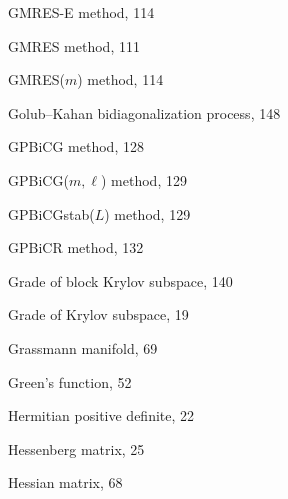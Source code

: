 \begin{description}
{GMRES-E method}, {114}\par

{GMRES method}, {111}\par

{GMRES($m$) method}, {114}\par

{Golub--Kahan bidiagonalization process}, {148}\par

{GPBiCG method}, {128}\par

{GPBiCG($m,\ell$) method}, {129}\par

{GPBiCGstab($L$) method}, {129}\par

{GPBiCR method}, {132}\par

{Grade of block Krylov subspace}, {140}\par

{Grade of Krylov subspace}, {19}\par

{Grassmann manifold}, {69}\par

{Green’s function}, {52}\par

\item[H]
{Hermitian positive definite}, {22}\par

{Hessenberg matrix}, {25}\par

{Hessian matrix}, {68}\par


\end{description}
